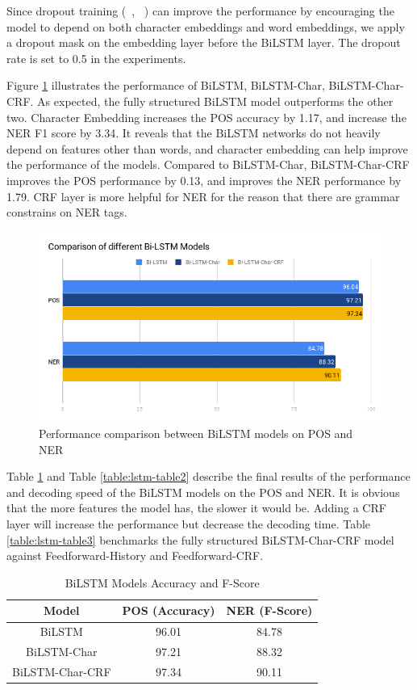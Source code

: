 \documentclass{sfuthesis}
\begin{document}
Since dropout training (~\citeauthor{hinton2012improving}, ~\citeyear{hinton2012improving}) can improve the performance by encouraging the model to depend on both character embeddings and word embeddings, we apply a dropout mask on the embedding layer before the BiLSTM layer. The dropout rate is set to 0.5 in the experiments.  

Figure \ref{fig:lstmbar} illustrates the performance of BiLSTM, BiLSTM-Char, BiLSTM-Char-CRF. As expected, the fully structured BiLSTM model outperforms the other two. Character Embedding increases the POS accuracy by 1.17, and increase the NER F1 score by 3.34. It reveals that the BiLSTM networks do not heavily depend on features other than words, and character embedding can help improve the performance of the models. Compared to BiLSTM-Char, BiLSTM-Char-CRF improves the POS performance by 0.13, and improves the NER performance by 1.79. CRF layer is more helpful for NER for the reason that there are grammar constrains on NER tags.

\begin{figure}
  \centering
  \includegraphics[scale=0.6]{lstmbar.png}
 \caption{Performance comparison between BiLSTM models on POS and NER}
  \label{fig:lstmbar}
\end{figure}

Table \ref{table:lstm-table1} and Table \ref{table:lstm-table2} describe the final results of the performance and decoding speed of the BiLSTM models on the POS and NER. It is obvious that the more features the model has, the slower it would be. Adding a CRF layer will increase the performance but decrease the decoding time. Table \ref{table:lstm-table3} benchmarks the fully structured BiLSTM-Char-CRF model against Feedforward-History and Feedforward-CRF. 

\begin{table}[]
\centering
\caption{BiLSTM Models Accuracy and F-Score}
\label{table:lstm-table1}
\begin{tabular}{|c|c|c|}
\hline
Model         & POS (Accuracy)  & NER (F-Score)       \\ \hline
BiLSTM  & 96.01     & 84.78                             \\ \hline
BiLSTM-Char & 97.21 & 88.32             \\ \hline
BiLSTM-Char-CRF & 97.34  & 90.11             \\ \hline
\end{tabular}
\end{table}
\end{document}
